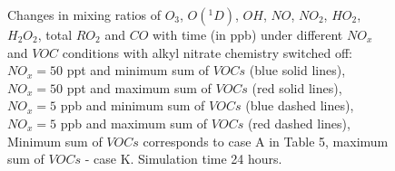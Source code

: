 \begin{figure}[h!]
\caption{Changes in mixing ratios of $O_3$, $O(^1D)$, $OH$, $NO$, $NO_2$, $HO_2$, $H_2O_2$, total $RO_2$ and $CO$ with time (in ppb) under different $NO_x$ and $VOC$ conditions with alkyl nitrate chemistry switched off: 
$NO_x=50$ ppt and minimum sum of $VOCs$ (blue solid lines), 
$NO_x=50$ ppt and maximum sum of $VOCs$ (red solid lines), 
$NO_x=5$ ppb and minimum sum of $VOCs$ (blue dashed lines),
$NO_x=5$ ppb and maximum sum of $VOCs$ (red dashed lines), Minimum sum of $VOCs$ corresponds to case A in Table 5, maximum sum of $VOCs$ - case K. Simulation time 24 hours.}
\label{fig:model_validation}
\end{figure}